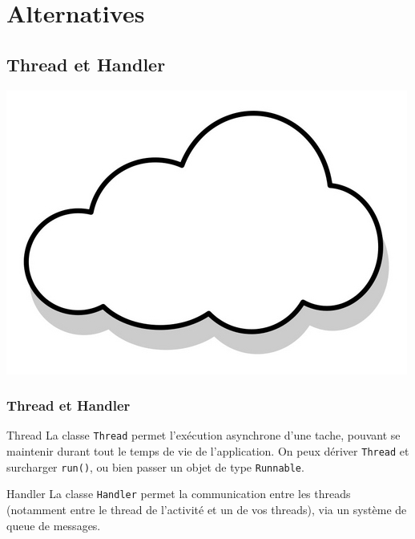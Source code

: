\documentclass{beamer}
\begin{document}
\section{Alternatives}
\subsection{Thread et Handler}

\begin{frame}
\begin{center}
\includegraphics[scale=0.2]{thread.jpg}
\end{center}
\frametitle{Thread et Handler}

\begin{block}{Thread}
La classe \verb!Thread! permet l'exécution asynchrone d'une tache, pouvant se maintenir durant tout le temps de vie de l'application.
On peux dériver \verb!Thread! et surcharger \verb!run()!, ou bien passer un objet de type \verb!Runnable!.
\end{block}

\begin{block}{Handler}
La classe \verb!Handler! permet la communication entre les threads (notamment entre le thread de l'activité et un de vos threads), via un système de queue de messages.
\end{block}

\end{frame}
\end{document}
